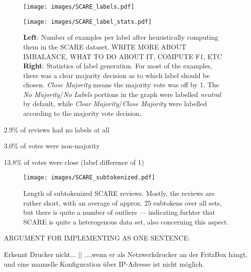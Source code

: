 \begin{figure}
  \begin{minipage}{0.45\linewidth}
  \vspace{0pt}
    \texttt{[image: images/SCARE\_labels.pdf]}
  \end{minipage}
  \hfill
  \begin{minipage}{0.45\linewidth}
  \vspace{0pt}
    \texttt{[image: images/SCARE\_label\_stats.pdf]}
  \end{minipage}
  \caption[Accumulated Gains and Losses.]{\textbf{Left}: Number of examples per label after heuristically computing them in the SCARE dataset. {\color{red} WRITE MORE ABOUT IMBALANCE, WHAT TO DO ABOUT IT, COMPUTE F1, ETC} \textbf{Right}: Statistics of label generation. For most of the examples, there was a clear majority decision as to which label should be chosen. \emph{Close Majority} means the majority vote was off by 1. The \emph{No Majority}/\emph{No Labels} portions in the graph were labelled \emph{neutral} by default, while \emph{Clear Majority}/\emph{Close Majority}  were labelled according to the majority vote decision.}
\end{figure}

2.9\% of reviews had no labels at all

3.0\% of votes were non-majority

13.8\% of votes were close (label difference of 1)

\begin{wrapfigure}{r}{0.45\linewidth}
  \centering
    \texttt{[image: images/SCARE\_subtokenized.pdf]}
  \caption[SCARE Lengths]{Length of subtokenized SCARE reviews. Mostly, the reviews are rather short, with an average of approx. 25 subtokens over all sets,
                        but there is quite a number of outliers --- indicating furhter that SCARE is quite a heterogenous data set, also concerning this aspect.}
\end{wrapfigure}

{\color{red} ARGUMENT FOR IMPLEMENTING AS ONE SENTENCE:}

\begin{examples}
  \item Erkennt Drucker nicht... || ...,wenn er als Netzwerkdrucker an der FritzBox hängt, und eine manuelle Konfiguration über IP-Adresse ist nicht möglich.
\end{examples}



